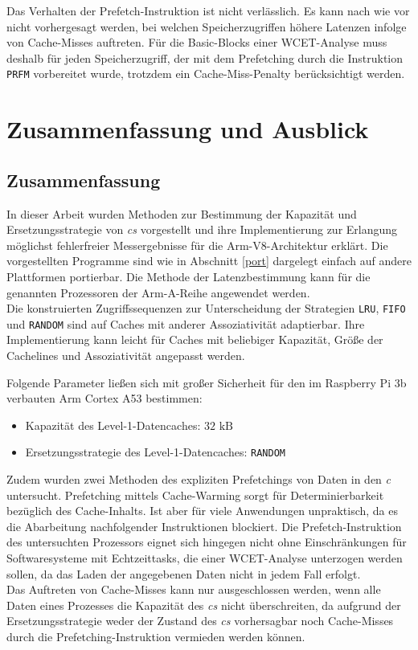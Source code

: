\documentclass[]{scrbook}
\begin{document}
Das Verhalten der Prefetch-Instruktion ist nicht verlässlich. Es kann nach wie vor nicht vorhergesagt werden, bei welchen Speicherzugriffen höhere Latenzen infolge von Cache-Misses auftreten.
Für die Basic-Blocks einer WCET-Analyse muss deshalb für jeden Speicherzugriff, der mit dem Prefetching durch die Instruktion \texttt{PRFM} vorbereitet wurde, trotzdem ein Cache-Miss-Penalty berücksichtigt werden.

\chapter{Zusammenfassung und Ausblick}
\section{Zusammenfassung}

In dieser Arbeit wurden Methoden zur Bestimmung der Kapazität und Ersetzungsstrategie von \textsl{\gls{c}s} vorgestellt und ihre Implementierung zur Erlangung möglichst fehlerfreier Messergebnisse für die Arm-V8-Architektur erklärt. 
Die vorgestellten Programme sind wie in Abschnitt \ref{port} dargelegt einfach auf andere Plattformen portierbar.
Die Methode der Latenzbestimmung kann für die genannten Prozessoren der Arm-A-Reihe angewendet werden.
\\
Die konstruierten Zugriffssequenzen zur Unterscheidung der Strategien \texttt{LRU}, \texttt{FIFO} und \texttt{RANDOM} sind auf Caches mit anderer Assoziativität adaptierbar.
Ihre Implementierung kann leicht für Caches mit beliebiger Kapazität, Größe der Cachelines und Assoziativität angepasst werden.

Folgende Parameter ließen sich mit großer Sicherheit für den im Raspberry Pi 3b verbauten Arm Cortex A53 bestimmen:

\begin{itemize}
	\item Kapazität des Level-1-Datencaches: $32\textrm{ kB}$
	\item Ersetzungsstrategie des Level-1-Datencaches: \texttt{RANDOM}
\end{itemize}

Zudem wurden zwei Methoden des expliziten Prefetchings von Daten in den \textsl{\gls{c}} untersucht.
Prefetching mittels Cache-Warming sorgt für Determinierbarkeit bezüglich des Cache-Inhalts. Ist aber für viele Anwendungen unpraktisch, da es die Abarbeitung nachfolgender Instruktionen blockiert.
Die Prefetch-Instruktion des untersuchten Prozessors eignet sich hingegen nicht ohne Einschränkungen für Softwaresysteme mit Echtzeittasks, die einer WCET-Analyse unterzogen werden sollen, da das Laden der angegebenen Daten nicht in jedem Fall erfolgt. 
\\
Das Auftreten von Cache-Misses kann nur ausgeschlossen werden, wenn alle Daten eines Prozesses die Kapazität des \textsl{\gls{c}s} nicht überschreiten, da aufgrund der Ersetzungsstrategie weder der Zustand des \textsl{\gls{c}s} vorhersagbar noch Cache-Misses durch die Prefetching-Instruktion vermieden werden können.
\end{document}
